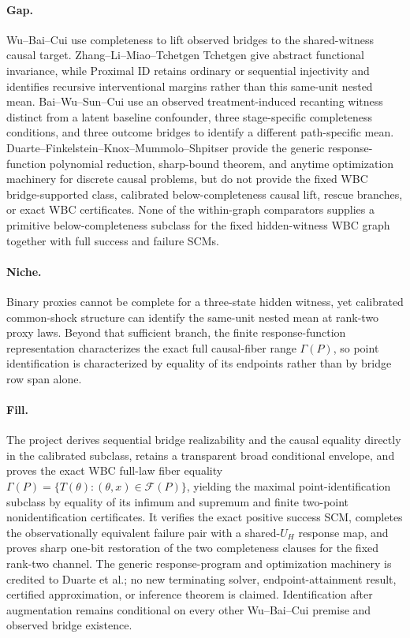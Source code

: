 \documentclass{article}
\begin{document}
\paragraph{Gap.} Wu--Bai--Cui use completeness to lift observed bridges to the shared-witness causal target. Zhang--Li--Miao--Tchetgen Tchetgen give abstract functional invariance, while Proximal ID retains ordinary or sequential injectivity and identifies recursive interventional margins rather than this same-unit nested mean. Bai--Wu--Sun--Cui use an observed treatment-induced recanting witness distinct from a latent baseline confounder, three stage-specific completeness conditions, and three outcome bridges to identify a different path-specific mean. Duarte--Finkelstein--Knox--Mummolo--Shpitser provide the generic response-function polynomial reduction, sharp-bound theorem, and anytime optimization machinery for discrete causal problems, but do not provide the fixed WBC bridge-supported class, calibrated below-completeness causal lift, rescue branches, or exact WBC certificates. None of the within-graph comparators supplies a primitive below-completeness subclass for the fixed hidden-witness WBC graph together with full success and failure SCMs.

\paragraph{Niche.} Binary proxies cannot be complete for a three-state hidden witness, yet calibrated common-shock structure can identify the same-unit nested mean at rank-two proxy laws. Beyond that sufficient branch, the finite response-function representation characterizes the exact full causal-fiber range \(\Gamma(P)\), so point identification is characterized by equality of its endpoints rather than by bridge row span alone.

\paragraph{Fill.} The project derives sequential bridge realizability and the causal equality directly in the calibrated subclass, retains a transparent broad conditional envelope, and proves the exact WBC full-law fiber equality \(\Gamma(P)=\{T(\theta):(\theta,x)\in\mathcal F(P)\}\), yielding the maximal point-identification subclass by equality of its infimum and supremum and finite two-point nonidentification certificates. It verifies the exact positive success SCM, completes the observationally equivalent failure pair with a shared-\(U_H\) response map, and proves sharp one-bit restoration of the two completeness clauses for the fixed rank-two channel. The generic response-program and optimization machinery is credited to Duarte et al.; no new terminating solver, endpoint-attainment result, certified approximation, or inference theorem is claimed. Identification after augmentation remains conditional on every other Wu--Bai--Cui premise and observed bridge existence.
\end{document}
